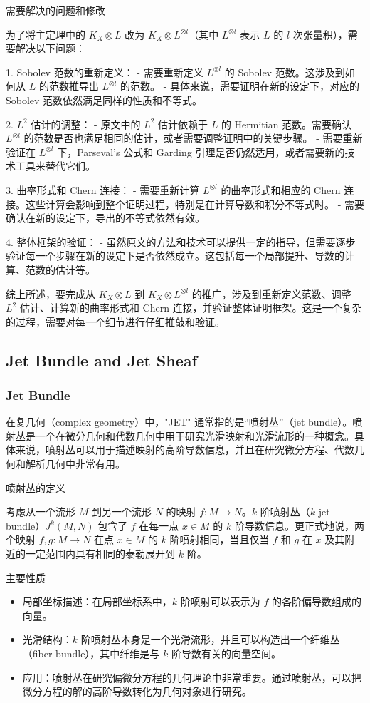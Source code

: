 \documentclass[lang=cn,12pt,fontset=none,a4paper]{beautybook}
\begin{document}
需要解决的问题和修改

为了将主定理中的 $K_X \otimes L$ 改为 $K_X \otimes L^{\otimes l}$（其中 $L^{\otimes l}$ 表示 $L$ 的 $l$ 次张量积），需要解决以下问题：

1. Sobolev 范数的重新定义：
- 需要重新定义 $L^{\otimes l}$ 的 Sobolev 范数。这涉及到如何从 $L$ 的范数推导出 $L^{\otimes l}$ 的范数。
- 具体来说，需要证明在新的设定下，对应的 Sobolev 范数依然满足同样的性质和不等式。

2. $L^2$ 估计的调整：
- 原文中的 $L^2$ 估计依赖于 $L$ 的 Hermitian 范数。需要确认 $L^{\otimes l}$ 的范数是否也满足相同的估计，或者需要调整证明中的关键步骤。
- 需要重新验证在 $L^{\otimes l}$ 下，Parseval's 公式和 Garding 引理是否仍然适用，或者需要新的技术工具来替代它们。

3. 曲率形式和 Chern 连接：
- 需要重新计算 $L^{\otimes l}$ 的曲率形式和相应的 Chern 连接。这些计算会影响到整个证明过程，特别是在计算导数和积分不等式时。
- 需要确认在新的设定下，导出的不等式依然有效。

4. 整体框架的验证：
- 虽然原文的方法和技术可以提供一定的指导，但需要逐步验证每一个步骤在新的设定下是否依然成立。这包括每一个局部提升、导数的计算、范数的估计等。

综上所述，要完成从 $K_X \otimes L$ 到 $K_X \otimes L^{\otimes l}$ 的推广，涉及到重新定义范数、调整 $L^2$ 估计、计算新的曲率形式和 Chern 连接，并验证整体证明框架。这是一个复杂的过程，需要对每一个细节进行仔细推敲和验证。

\subsection{Jet Bundle and Jet Sheaf}
\subsubsection*{Jet Bundle}
在复几何（complex geometry）中，"JET" 通常指的是“喷射丛”（jet bundle）。喷射丛是一个在微分几何和代数几何中用于研究光滑映射和光滑流形的一种概念。具体来说，喷射丛可以用于描述映射的高阶导数信息，并且在研究微分方程、代数几何和解析几何中非常有用。

喷射丛的定义

考虑从一个流形 $M$ 到另一个流形 $N$ 的映射 $f: M \to N$。$k$ 阶喷射丛（$k$-jet bundle）$J^k(M, N)$ 包含了 $f$ 在每一点 $x \in M$ 的 $k$ 阶导数信息。更正式地说，两个映射 $f, g: M \to N$ 在点 $x \in M$ 的 $k$ 阶喷射相同，当且仅当 $f$ 和 $g$ 在 $x$ 及其附近的一定范围内具有相同的泰勒展开到 $k$ 阶。

主要性质
\begin{itemize}
   \item 局部坐标描述：在局部坐标系中，$k$ 阶喷射可以表示为 $f$ 的各阶偏导数组成的向量。
   \item 光滑结构：$k$ 阶喷射丛本身是一个光滑流形，并且可以构造出一个纤维丛（fiber bundle），其中纤维是与 $k$ 阶导数有关的向量空间。
   \item 应用：喷射丛在研究偏微分方程的几何理论中非常重要。通过喷射丛，可以把微分方程的解的高阶导数转化为几何对象进行研究。
\end{itemize}
\end{document}

